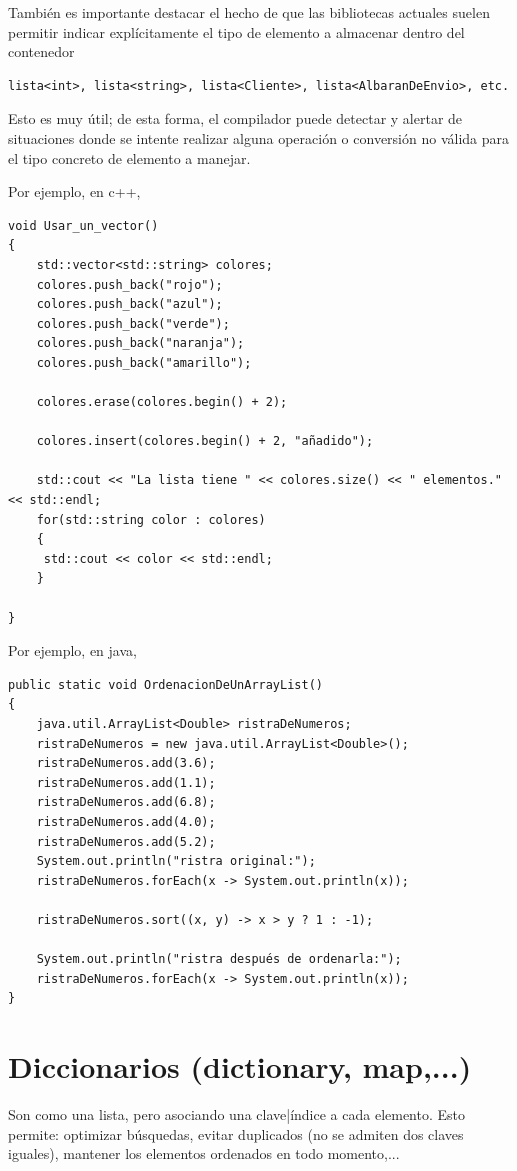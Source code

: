 \documentclass[spanish,12pt,a4paper,final,oneside]{book}
\begin{document}
También es importante destacar el hecho de que las bibliotecas actuales suelen permitir indicar explícitamente el tipo de elemento a almacenar dentro del contenedor 
\begin{lstlisting}[frame=single]
lista<int>, lista<string>, lista<Cliente>, lista<AlbaranDeEnvio>, etc.
\end{lstlisting} 

Esto es muy útil; de esta forma, el compilador puede detectar y alertar de situaciones donde se intente realizar alguna operación o conversión no válida para el tipo concreto de elemento a manejar.

Por ejemplo, en c++,
\begin{lstlisting}[frame=single]
void Usar_un_vector()
{
    std::vector<std::string> colores;
    colores.push_back("rojo");
    colores.push_back("azul");
    colores.push_back("verde");
    colores.push_back("naranja");
    colores.push_back("amarillo");

    colores.erase(colores.begin() + 2);

    colores.insert(colores.begin() + 2, "añadido");

    std::cout << "La lista tiene " << colores.size() << " elementos." << std::endl;
    for(std::string color : colores)
    {
   	 std::cout << color << std::endl;
    }

}
\end{lstlisting}
Por ejemplo, en java,
\begin{lstlisting}[frame=single]
public static void OrdenacionDeUnArrayList()
{
    java.util.ArrayList<Double> ristraDeNumeros;
    ristraDeNumeros = new java.util.ArrayList<Double>();
    ristraDeNumeros.add(3.6);
    ristraDeNumeros.add(1.1);
    ristraDeNumeros.add(6.8);
    ristraDeNumeros.add(4.0);
    ristraDeNumeros.add(5.2);
    System.out.println("ristra original:");
    ristraDeNumeros.forEach(x -> System.out.println(x));
   	 
    ristraDeNumeros.sort((x, y) -> x > y ? 1 : -1);

    System.out.println("ristra después de ordenarla:");
    ristraDeNumeros.forEach(x -> System.out.println(x));
}
\end{lstlisting}


\section{Diccionarios (dictionary, map,...)}
Son como una lista, pero asociando una clave|índice a cada elemento. Esto permite: optimizar búsquedas, evitar duplicados (no se admiten dos claves iguales), mantener los elementos ordenados en todo momento,... 
\end{document}
